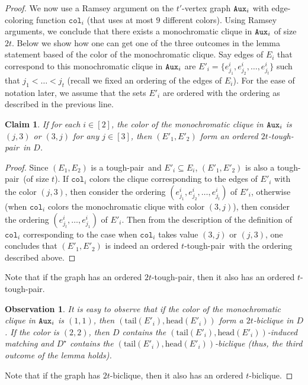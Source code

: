 \documentclass[a4paper,11pt]{article}
\theoremstyle{plain}
\newtheorem{observation}[theorem]{Observation}
\newtheorem{claim}[theorem]{Claim}
\newtheorem{identification rule}{Identification Rule}
\theoremstyle{definition}
\theoremstyle{remark}
\newenvironment{claimproof}{\begin{proof}\renewcommand{\qedsymbol}{\claimqed}}{\end{proof}\renewcommand{\qedsymbol}{\plainqed}}
\let\plainqed\qedsymbol
\newcommand{\claimqed}{$\lrcorner$}
\newcommand{\toughpair}{tough-pair}
\newcommand{\head}{\text{head}}
\newcommand{\tail}{\text{tail}}
\newcommand{\aux}[1]{\textnormal{\texttt{Aux}}_{#1}}
\newcommand{\col}{\texttt{col}}
\begin{document}
\begin{proof}
We now use a Ramsey argument on the $t'$-vertex graph $\aux{i}$ with edge-coloring function $\col_i$ (that uses at most $9$ different colors). Using Ramsey arguments, we conclude that there exists a monochromatic clique in $\aux{i}$ of size $2t$. Below we show how one can get one of the three outcomes in the lemma statement based of the color of the monochromatic clique. Say edges of $E_i$ that correspond to this monochromatic clique in $\aux{i}$ are 
$E'_i=\{e^i_{j_1}, e^i_{j_2}, \ldots , e^i_{j_{t}}\}$ such that $j_1 < \ldots < j_{t}$ (recall we fixed an ordering of the edges of $E_i$). For the ease of notation later, we assume that the sets $E'_i$ are ordered with the ordering as described in the previous line.

\begin{claim}\label{claim:ramsey-orderedpair}
If for each $i \in [2]$, the color of the monochromatic clique in $\aux{i}$ is $(j,3)$ or $(3,j)$ for any $j \in [3]$, then $(E'_1,E'_2)$ form an ordered $2t$-\toughpair\ in $D$.
\end{claim}

\begin{claimproof}
Since $(E_1,E_2)$ is a \toughpair\ and $E'_i \subseteq E_i$, $(E'_1,E'_2)$ is also a \toughpair\ (of size $t$). If $\col_i$ colors the clique corresponding to the edges of $E'_i$ with the color $(j,3)$, then consider the ordering $(e^i_{j_1}, e^i_{j_2}, \ldots , e^i_{j_{t}})$ of $E'_i$, otherwise (when $\col_i$ colors the monochromatic clique with color $(3,j)$), then consider the ordering $(e^i_{j_{t}}, \ldots , e^i_{j_1})$ of $E'_i$. Then from the description of the definition of $\col_i$ corresponding to the case when $\col_i$ takes value $(3,j)$ or $(j,3)$, one concludes that $(E'_1,E'_2)$ is indeed an ordered $t$-\toughpair\ with the ordering described above.
\end{claimproof}
Note that if the graph has an ordered $2t$-\toughpair, then it also has an ordered $t$-\toughpair.

\begin{observation}\label{obs:ramsey-biclique}
It is easy to observe that if the color of the monochromatic clique in $\aux{i}$ is $(1,1)$, then $(\tail(E'_i),\head(E'_i))$ form a $2t$-biclique in $D$. If the color is $(2,2)$, then $D$ contains the $(\tail(E'_i),\head(E'_i))$-induced matching and $D^{\star}$ contains the $(\tail(E'_i),\head(E'_i))$-biclique (thus, the third outcome of the lemma holds). 
\end{observation}

Note that if the graph has $2t$-biclique, then it also has an ordered $t$-biclique.


\end{proof}
\end{document}
